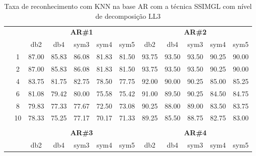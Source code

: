 \begin{table}[H]
	\centering
    \normalsize
	\caption{Taxa de reconhecimento com KNN na base AR com a técnica SSIMGL com nível de decomposição LL3}
	\begin{tabular}{|c|c|c c c c c|c c c c c|}
\cline{3-12}
\multicolumn{2}{c|}{\multirow{2}{*}{}} & \multicolumn{5}{c|}{\textbf{AR\#1}}  & \multicolumn{5}{c|}{\textbf{AR\#2}} \\\cline{3-12}

\multicolumn{2}{c|}{}  & db2 & db4 & sym3 & sym4 & sym5 & db2 & db4& sym3 & sym4 & sym5 \\\hline

\multicolumn{1}{|c|}{ \multirow{5}{*}{\rotatebox[origin=c]{90}{\textbf{K-vizinhos}}} }
&1	& 87.00	& 85.83	& 86.08	& 81.83	& 81.50 & 93.75&	93.50&	93.50&	90.25&	90.00 \\\cline{2-12}
 
&2	& 87.00	& 85.83	& 86.08	& 81.83	& 81.50 & 93.75&	93.50&	93.50&	90.25&	90.00 \\\cline{2-12}
 
&4	& 83.75	& 81.75	& 82.75	& 78.50	& 77.75 & 92.00&	90.00&	90.25&	85.00&	85.25 \\\cline{2-12}
 
&6	& 81.08	& 79.42	& 80.00	& 75.58	& 75.42 & 91.00&	89.50&	90.25&	84.50&	84.75 \\\cline{2-12}
 
&8	& 79.83	& 77.33	& 77.67	& 72.50	& 73.08 & 90.25&	88.00&	89.00&	83.50&	83.75 \\\cline{2-12}
 
&10	& 78.33	& 75.25	& 77.17	& 70.17	& 71.33 & 89.25&	85.50&	88.75&	82.75&	83.00 \\\cline{2-12}
\\\midrule




\cline{3-12}
\multicolumn{2}{c}{} & \multicolumn{5}{|c|}{\textbf{AR\#3}}  & \multicolumn{5}{c|}{\textbf{AR\#4}} \\\cline{3-12}
\multicolumn{2}{c}{}  & \multicolumn{1}{|c}{db2} & db4 & sym3 & sym4 & sym5 & db2 & db4& sym3 & sym4 & sym5 \\\hline


\end{tabular}
\end{table}
